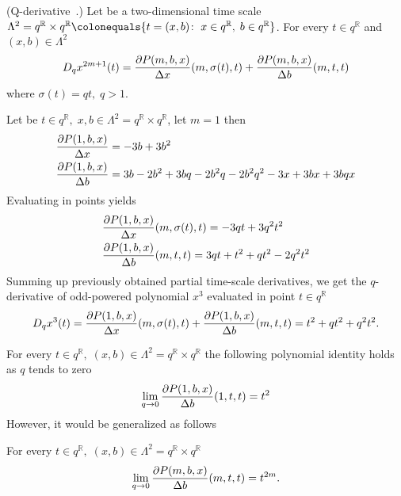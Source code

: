 \begin{cor}
    \label{q_derivative_case}
    (Q-derivative~\cite{jackson_1909}.)
    Let be a two-dimensional time scale
    $\Lambda^2 = q^{\mathbb{R}} \times q^{\mathbb{R}} \colonequals \{t=(x,b) \colon \; x\in q^{\mathbb{R}}, \; b \in q^{\mathbb{R}} \}$.
    For every $t\in q^{\mathbb{R}}$ and $(x,b)\in \Lambda^2$
    \begin{align*}
        D_{q} x^{2m+1}(t)
        = \frac{\partial P ( m, b, x )}{\Delta x} (m, \sigma(t), t)
        + \frac{\partial P ( m, b, x )}{\Delta b} (m, t, t)
    \end{align*}
    where $\sigma(t) = qt, \; q > 1$.
\end{cor}
\begin{examp}
    \label{time_scale_qn_example_1}
    Let be $t\in q^{\mathbb{R}}, \; x,b\in \Lambda^2 = q^{\mathbb{R}} \times q^{\mathbb{R}}$, let $m=1$ then
    \begin{align*}
        &\frac{\partial P ( 1, b, x )}{\Delta x} = -3 b + 3 b^2 \\
        &\frac{\partial P ( 1, b, x )}{\Delta b} = 3 b - 2 b^2 + 3 b q - 2 b^2 q - 2 b^2 q^2 - 3 x + 3 b x + 3 b q x
    \end{align*}
    Evaluating in points yields
    \begin{align*}
        &\frac{\partial P ( 1, b, x )}{\Delta x} (m, \sigma(t), t) = -3 q t + 3 q^2 t^2 \\
        &\frac{\partial P ( 1, b, x )}{\Delta b} (m, t, t) = 3 q t + t^2 + q t^2 - 2 q^2 t^2
    \end{align*}
    Summing up previously obtained partial time-scale derivatives, we get the $q$-derivative of odd-powered polynomial
    $x^{3}$ evaluated in point $t\in q^{\mathbb{R}}$
    \begin{align*}
        D_{q} x^{3}(t)
        = \frac{\partial P ( 1, b, x )}{\Delta x} (m, \sigma(t), t)
        + \frac{\partial P ( 1, b, x )}{\Delta b} (m, t, t)
        = t^2 + q t^2 + q^2 t^2.
    \end{align*}
\end{examp}
For every $t\in q^{\mathbb{R}}, \; (x,b) \in \Lambda^2 = q^{\mathbb{R}} \times q^{\mathbb{R}}$
the following polynomial identity holds as $q$ tends to zero
\begin{align*}
    \lim \limits_{q \to 0} \frac{\partial P ( 1, b, x )}{\Delta b} (1, t, t) = t^2
\end{align*}
However, it would be generalized as follows
\begin{cor}
    \label{time_scale_qn_corollary_1}
    For every $t\in q^{\mathbb{R}}, \; (x,b) \in \Lambda^2 = q^{\mathbb{R}} \times q^{\mathbb{R}}$
    \begin{align*}
        \lim \limits_{q \to 0} \frac{\partial P ( m, b, x )}{\Delta b} (m, t, t) = t^{2m}.
    \end{align*}
\end{cor}
